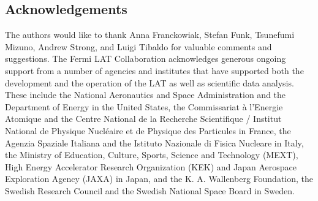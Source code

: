 \subsection*{Acknowledgements}

The authors would like to thank Anna Franckowiak, Stefan Funk, Tsunefumi Mizuno, Andrew Strong, and Luigi Tibaldo for valuable comments and suggestions.
The Fermi LAT Collaboration acknowledges generous ongoing support from a number of agencies and institutes that have supported both the development and the operation of the LAT as well as scientific data analysis. These include the National Aeronautics and Space Administration and the Department of Energy in the United States, the Commissariat à l'Energie Atomique and the Centre National de la Recherche Scientifique / Institut National de Physique Nucléaire et de Physique des Particules in France, the Agenzia Spaziale Italiana and the Istituto Nazionale di Fisica Nucleare in Italy, the Ministry of Education, Culture, Sports, Science and Technology (MEXT), High Energy Accelerator Research Organization (KEK) and Japan Aerospace Exploration Agency (JAXA) in Japan, and the K. A. Wallenberg Foundation, the Swedish Research Council and the Swedish National Space Board in Sweden.




